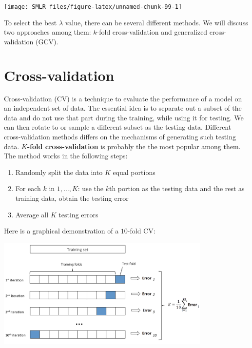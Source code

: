 \documentclass[
]{book}
\providecommand{\tightlist}{%
  \setlength{\itemsep}{0pt}\setlength{\parskip}{0pt}}
\theoremstyle{definition}
\theoremstyle{definition}
\theoremstyle{definition}
\theoremstyle{definition}
\theoremstyle{remark}
\begin{document}
\begin{center}\texttt{[image: SMLR\_files/figure-latex/unnamed-chunk-99-1]} \end{center}

To select the best \(\lambda\) value, there can be several different methods. We will discuss two approaches among them: \(k\)-fold cross-validation and generalized cross-validation (GCV).

\hypertarget{cross-validation}{%
\section{Cross-validation}\label{cross-validation}}

Cross-validation (CV) is a technique to evaluate the performance of a model on an independent set of data. The essential idea is to separate out a subset of the data and do not use that part during the training, while using it for testing. We can then rotate to or sample a different subset as the testing data. Different cross-validation methods differs on the mechanisms of generating such testing data. \textbf{\(K\)-fold cross-validation} is probably the the most popular among them. The method works in the following steps:

\begin{enumerate}
\def\labelenumi{\arabic{enumi}.}
\tightlist
\item
  Randomly split the data into \(K\) equal portions
\item
  For each \(k\) in \(1, \ldots, K\): use the \(k\)th portion as the testing data and the rest as training data, obtain the testing error
\item
  Average all \(K\) testing errors
\end{enumerate}

Here is a graphical demonstration of a \(10\)-fold CV:

\includegraphics[width=0.8\textwidth,height=\textheight]{images/kfoldcv.png}
\end{document}
